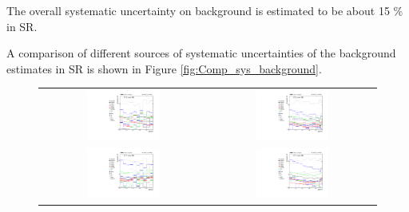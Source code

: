 The overall systematic uncertainty on background is estimated to be about 15 $\%$ in SR.

 A comparison of different sources of systematic uncertainties of the background estimates in SR is shown in Figure \ref{fig:Comp_sys_background}.

\begin{figure}[tbh!]
 \begin{center}
 \begin{tabular}{cc}
  \includegraphics[width=0.45\textwidth]{figures/Part3/Systematics/sysBDT_ST_bkg_2016}&
  \includegraphics[width=0.45\textwidth]{figures/Part3/Systematics/sysBDT_TT_bkg_2016} \\
    \includegraphics[width=0.45\textwidth]{figures/Part3/Systematics/sysBDT_ST_bkg_2017}&
  \includegraphics[width=0.45\textwidth]{figures/Part3/Systematics/sysBDT_TT_bkg_2017} \\

\end{tabular}
\end{center}
\end{figure}
